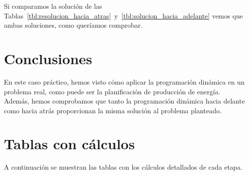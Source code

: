 \documentclass[12pt,a4paper,twoside,openright,titlepage,final]{article}
\begin{document}
Si comparamos la solución de las Tablas~\ref{tbl:resolucion_hacia_atras}~y~\ref{tbl:solucion_hacia_adelante} vemos que ambas soluciones, como queríamos comprobar.

\section{Conclusiones}

En este caso práctico, hemos visto cómo aplicar la programación dinámica en un problema real, como puede ser la planificación de producción de energía.\\

Además, hemos comprobamos que tanto la programación dinámica hacia delante como hacia atrás proporcionan la misma solución al problema planteado.


\clearpage

\section{Tablas con cálculos}

A continuación se muestran las tablas con los cálculos detallados de cada etapa.
\end{document}

